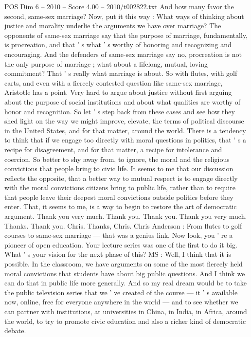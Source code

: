 \begin{textsample}{POS Dim 6 – 2010 – Score 4.00 – 2010/t002822.txt}
And how many favor the second, same-sex marriage?
Now, put it this way : What ways of thinking about justice and morality underlie the arguments we have over marriage?
The opponents of same-sex marriage say that the purpose of marriage, fundamentally, is procreation, and that ' s what ' s worthy of honoring and recognizing and encouraging.
And the defenders of same-sex marriage say no, procreation is not the only purpose of marriage ; what about a lifelong, mutual, loving commitment?
That ' s really what marriage is about.
So with flutes, with golf carts, and even with a fiercely contested question like same-sex marriage, Aristotle has a point.
Very hard to argue about justice without first arguing about the purpose of social institutions and about what qualities are worthy of honor and recognition.
So let ' s step back from these cases and see how they shed light on the way we might improve, elevate, the terms of political discourse in the United States, and for that matter, around the world.
There is a tendency to think that if we engage too directly with moral questions in politics, that ' s a recipe for disagreement, and for that matter, a recipe for intolerance and coercion.
So better to shy away from, to ignore, the moral and the religious convictions that people bring to civic life.
It seems to me that our discussion reflects the opposite, that a better way to mutual respect is to engage directly with the moral convictions citizens bring to public life, rather than to require that people leave their deepest moral convictions outside politics before they enter.
That, it seems to me, is a way to begin to restore the art of democratic argument.
Thank you very much.
Thank you.
Thank you.
Thank you very much.
Thanks.
Thank you.
Chris.
Thanks, Chris.
Chris Anderson : From flutes to golf courses to same-sex marriage — that was a genius link.
Now look, you ' re a pioneer of open education.
Your lecture series was one of the first to do it big.
What ' s your vision for the next phase of this?
MS : Well, I think that it is possible.
In the classroom, we have arguments on some of the most fiercely held moral convictions that students have about big public questions.
And I think we can do that in public life more generally.
And so my real dream would be to take the public television series that we ' ve created of the course — it ' s available now, online, free for everyone anywhere in the world — and to see whether we can partner with institutions, at universities in China, in India, in Africa, around the world, to try to promote civic education and also a richer kind of democratic debate.

\end{textsample}
